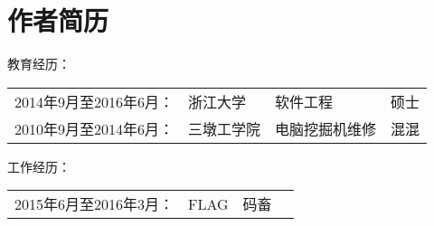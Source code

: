 \chapter{作者简历}
\noindent 教育经历：

\begin{tabular}{llll}
    2014年9月至2016年6月： &  浙江大学  & 软件工程  &  硕士    \\
    2010年9月至2014年6月： &  三墩工学院  & 电脑挖掘机维修  &  混混
\end{tabular}

\noindent 工作经历：

\begin{tabular}{llll}
    2015年6月至2016年3月： &  FLAG   &  码畜
\end{tabular}

